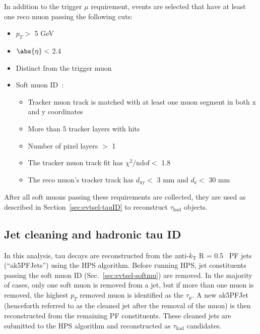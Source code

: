 In addition to the trigger $\mu$ requirement, events are selected that have at least one reco muon passing the following cuts:
\begin{itemize}
	\item $p_T >$ 5 GeV
	\item $\abs{\eta} <$ 2.4
	\item Distinct from the trigger muon
	\item Soft muon ID~\cite{CMS:2010uta}:
	\begin{itemize}
		\item Tracker muon track is matched with at least one muon segment in both \unit{x} and y coordinates
		\item More than 5 tracker layers with hits
		\item Number of pixel layers $>$ 1
		\item The tracker muon track fit has $\chi^{2}/\text{ndof} <$ 1.8
		\item The reco muon's tracker track has $d_{\text{xy}} <$ 3 mm and $d_{\text{z}} <$ 30 mm
	\end{itemize}
\end{itemize}
After all soft muons passing these requirements are collected, they are used as described in Section~\ref{sec:evtsel-tauID} to reconstruct $\tau_{\text{had}}$ objects.

\subsection{Jet cleaning and hadronic tau ID\label{sec:evtsel-tauID}}

In this analysis, tau decays are reconstructed from the anti-$k_{\text{T}}$ R = 0.5~\cite{1126-6708-2008-04-063} PF jets (``ak5PFJets'') using the HPS algorithm. Before running HPS, jet constituents passing the soft muon ID (Sec.~\ref{sec:evtsel-softmu}) are removed. In the majority of cases, only one soft muon is removed from a jet, but if more than one muon is removed, the highest $p_T$ removed muon is identified as the $\tau_{\mu}$. A new ak5PFJet (henceforth referred to as the cleaned jet after the removal of the muon) is then reconstructed from the remaining PF constituents. These cleaned jets are submitted to the HPS algorithm and reconstructed as $\tau_{\text{had}}$ candidates.

